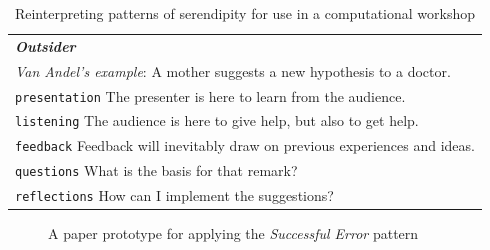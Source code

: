 \documentclass[letter]{article}
\begin{document}
\begin{table}[p]
\begin{tabular}{p{}}
{\bf\emph{Outsider}}  \\
\emph{Van Andel's example}:  A mother suggests a new hypothesis to a doctor. \\[.2cm]
{\tt presentation} The presenter is here to learn from the audience. \\
{\tt listening}   The audience is here to give help, but also to get help.\\
{\tt feedback}     Feedback will inevitably draw on previous experiences and ideas.\\
{\tt questions}    What is the basis for that remark?\\
{\tt reflections}  How can I implement the suggestions?\\
\end{tabular}
\vspace{.2cm}
\caption{Reinterpreting patterns of serendipity for use in a computational workshop\label{tab:reinterpret}}
\end{table}


\begin{figure}[t]
\begin{center}
\end{center}
\caption{A paper prototype for applying the \emph{Successful Error} pattern\label{fig:paper-prototype}}
\end{figure}
\end{document}
